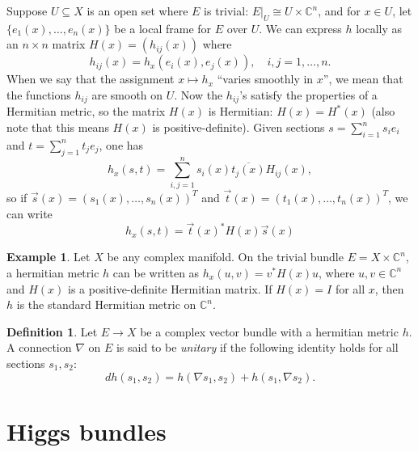 \documentclass[10pt]{amsart}
\numberwithin{equation}{section}
\newcommand{\C}{\mathbb{C}}
\theoremstyle{plain}
\theoremstyle{definition}
\newtheorem{defn}[thm]{Definition}
\newtheorem{ex}[thm]{Example}
\theoremstyle{remark}
\begin{document}
Suppose $U \subseteq X$ is an open set where $E$ is trivial: $E|_U \cong U \times \C^n$, and for $x \in U$, let $\{e_1(x), \hdots, e_n(x)\}$ be a local frame for $E$ over $U$. We can express $h$ locally as an $n \times n$ matrix $H(x) = (h_{ij}(x))$ where
\[h_{ij}(x) = h_x(e_i(x), e_j(x)), \quad i, j = 1, \hdots, n.\]
When we say that the assignment $x \mapsto h_x$ ``varies smoothly in $x$'', we mean that the functions $h_{ij}$ are smooth on $U$. Now the $h_{ij}$'s satisfy the properties of a Hermitian metric, so the matrix $H(x)$ is Hermitian: $H(x) = H^*(x)$ (also note that this means $H(x)$ is positive-definite). Given sections $s = \sum_{i=1}^n s_ie_i$ and $t = \sum_{j=1}^n t_j e_j$, one has
\[h_x(s, t) = \sum_{i, j = 1}^n s_i(x) \overline{t_j(x)} H_{ij}(x),\]
so if $\vec{s}(x) = (s_1(x), \hdots, s_n(x))^T$ and $\vec{t}(x) = (t_1(x), \hdots, t_n(x))^T$, we can write 
\[h_x(s, t) = \vec{t}(x)^* H(x) \vec{s}(x)\]

\begin{ex}
    Let $X$ be any complex manifold. On the trivial bundle $E = X \times \C^n$, a hermitian metric $h$ can be written as $h_x(u, v) = v^* H(x) u$, where $u, v \in \C^n$ and $H(x)$ is a positive-definite Hermitian matrix. If $H(x) = I$ for all $x$, then $h$ is the standard Hermitian metric on $\C^n$. 
\end{ex}

\begin{defn}
    Let $E \to X$ be a complex vector bundle with a hermitian metric $h$. A connection $\nabla$ on $E$ is said to be \emph{unitary} if the following identity holds for all sections $s_1, s_2$:
    \[dh(s_1, s_2) = h(\nabla s_1, s_2) + h(s_1, \nabla s_2).\]
\end{defn}


\section{Higgs bundles}
\end{document}
